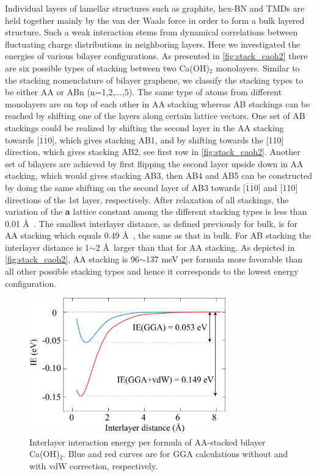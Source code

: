 Individual layers of lamellar structures such as graphite, hex-BN and TMDs 
are held together mainly by the van der Waals force in order to form a bulk 
layered structure. Such a weak interaction stems from dynamical correlations 
between 
fluctuating charge distributions in neighboring layers. Here we 
investigated the energies of various bilayer configurations. As presented
in \autoref{fig:stack_caoh2} there are six possible types of stacking between two 
Ca(OH)$_2$ monolayers. Similar to the stacking nomenclature of bilayer graphene, 
we classify the stacking types to be either AA or ABn (n=1,2,...,5). The 
same type of atoms from different monolayers are on top of each other in AA 
stacking whereas AB stackings can be reached by shifting one of the layers along 
certain lattice vectors. One set of AB stackings could be realized by shifting 
the second layer in the AA stacking towards [$\overline{1}\overline{1}0$], 
which gives stacking AB1, and by shifting towards the [110] direction, which 
gives stacking AB2, see first row in \autoref{fig:stack_caoh2}. Another set of 
bilayers are achieved by first flipping the second layer upside down in AA 
stacking, which
would gives stacking AB3, then AB4 and AB5 can be constructed by doing the 
same shifting on the second layer of AB3 towards [$\overline{1}\overline{1}0$] 
and [110] directions of the 1st layer, respectively. After relaxation of all 
stackings, the variation of the \textbf{a} lattice constant among the different 
stacking types is less than 0.01 \AA~. The smallest interlayer
distance, as defined previously for bulk, is for AA stacking which equals
0.49 \AA~, the same as that in bulk. For AB
stacking the interlayer distance is 1$\sim$2 \AA ~larger than that for AA
stacking. As depicted in \autoref{fig:stack_caoh2}, AA stacking is 96$\sim$137 meV
per formula more favorable than all other possible stacking types and hence it
corresponds to the lowest energy configuration. 


\begin{figure}
\centering
\includegraphics[width=8.5cm]{int_caoh2.eps}
\caption{\label{fig:int_caoh2} Interlayer interaction energy per formula of
AA-stacked bilayer Ca(OH)$_2$. Blue and red curves are for GGA calculations
without and with vdW correction, respectively.}
\end{figure}

